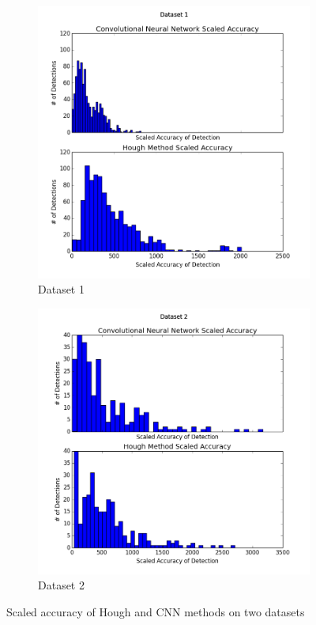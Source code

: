 \documentclass[12pt]{article}
\begin{document}
\begin{figure}
\centering
\begin{subfigure}{.5\textwidth}
  \centering
  \includegraphics[width=1.1\textwidth]{AccuracyComparison1}
  \caption{Dataset 1}
  \label{Dataset1}
\end{subfigure}%
\begin{subfigure}{.5\textwidth}
  \centering
  \includegraphics[width=1.1\textwidth]{AccuracyComparison2}
  \caption{Dataset 2}
  \label{Dataset2}
\end{subfigure}
\vspace{20pt}
\caption[Scaled accuracy of Hough and CNN methods on two datasets]{Scaled accuracy of Hough and CNN methods on two datasets}
\label{accuracy}
\end{figure}
\end{document}
